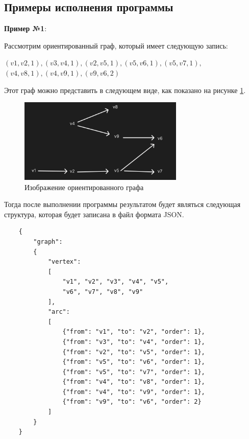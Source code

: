 \documentclass[bachelor, och, otchet]{template}
\begin{document}
\subsection{Примеры исполнения программы}

\textbf{Пример №1}:

Рассмотрим ориентированный граф, который имеет следующую запись:

\begin{center}
    $(v1, v2, 1),(v3, v4, 1),(v2, v5, 1),(v5, v6, 1),(v5, v7, 1),$ \\ $(v4, v8, 1),(v4, v9, 1), (v9, v6, 2)$
\end{center}

Этот граф можно представить в следующем виде, как показано на рисунке \ref{p1}.

\begin{figure}[H]
    \centering
    \includegraphics[width=0.7\textwidth]{pics/1.1.png}
    \caption{Изображение ориентированного графа}
    \label{p1}
\end{figure} 

Тогда после выполнении программы результатом будет являться следующая структура, которая
будет записана в файл формата JSON.

\begin{verbatim}
    {
        "graph": 
        {
            "vertex": 
            [
                "v1", "v2", "v3", "v4", "v5", 
                "v6", "v7", "v8", "v9"
            ], 
            "arc": 
            [
                {"from": "v1", "to": "v2", "order": 1}, 
                {"from": "v3", "to": "v4", "order": 1}, 
                {"from": "v2", "to": "v5", "order": 1}, 
                {"from": "v5", "to": "v6", "order": 1}, 
                {"from": "v5", "to": "v7", "order": 1}, 
                {"from": "v4", "to": "v8", "order": 1}, 
                {"from": "v4", "to": "v9", "order": 1}, 
                {"from": "v9", "to": "v6", "order": 2}
            ]
        }
    }
    \end{verbatim}
\end{document}
